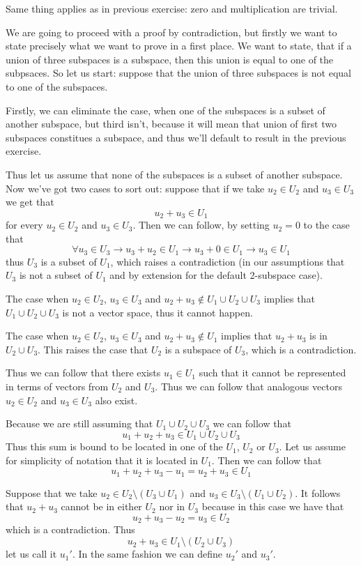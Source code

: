 \documentclass[11pt,oneside,titlepage]{book}
\begin{document}
Same thing applies as in previous exercise: zero and multiplication are
trivial.

We are going to proceed with a proof by contradiction, but firstly we want
to state precisely what we want to prove in a first place. We want to state,
that if a union of three subspaces is a subspace, then this union is equal to
one of the subpsaces. So let us start: suppose that the union of three subspaces is not equal to one of the subspaces.

Firstly, we can eliminate the case, when one of the subspaces is a
subset of another subspace, but third isn't, because it will mean that
union of first two subspaces constitues a subspace, and thus we'll default
to result in the previous exercise.

Thus let us assume that none of the subspaces is a subset of another subspace.
Now we've got two cases to sort out: suppose that if we take $u_2 \in U_2$
and $u_3 \in U_3$ we get that
$$u_2 + u_3 \in U_1$$
for every $u_2 \in U_2$ and $u_3 \in U_3$. Then we can follow, by setting
$u_2 = 0$ to the case that
$$\forall u_3 \in U_3 \to u_3 + u_2 \in U_1 \to u_3 + 0 \in U_1 \to
u_3 \in U_1$$
thus $U_3$ is a subset of $U_1$, which raises a contradiction (in our
assumptions that $U_3$ is not a subset of $U_1$  and by extension
for the default 2-subspace case).

The case when $u_2 \in U_2$, $u_3 \in U_3$ and $u_2 + u_3 \notin
U_1 \cup U_2 \cup U_3$ implies that $U_1 \cup U_2 \cup U_3$ is
not a vector space, thus it cannot happen.

The case when $u_2 \in U_2$, $u_3 \in U_3$ and $u_2 + u_3 \notin U_1$
implies that $u_2 + u_3$ is  in $U_2 \cup U_3$. This raises the case that
$U_2$ is a subspace of $U_3$, which is a contradiction.

Thus we can follow that there exists $u_1 \in U_1$ such that it
cannot be represented in terms of vectors from $U_2$ and $U_3$.
Thus we can follow that analogous  vectors   $u_2 \in U_2$ and $u_3 \in U_3$
also exist.

Because we are still assuming that $U_1 \cup U_2 \cup U_3$ we can follow that
$$u_1 + u_2 + u_3 \in U_1 \cup U_2 \cup U_3$$
Thus this sum is bound to be located in one of the $U_1$, $U_2$ or $U_3$.
Let us assume for simplicity of notation that it is located in $U_1$. Then
we can follow that
$$u_1 + u_2 + u_3 - u_1 = u_2 + u_3 \in U_1$$

Suppose that we take $u_2 \in U_2 \setminus (U_3 \cup U_1)$ and
$u_3 \in U_3 \setminus (U_1 \cup U_2)$. It follows that
$u_2 + u_3$ cannot be in either $U_2$ nor in $U_3$ because in this
case we have that
$$u_2 + u_3 - u_2 = u_3 \in U_2$$
which is a contradiction. Thus
$$u_2 + u_3 \in U_1 \setminus (U_2 \cup U_3)$$
let us call it $u_1'$. In the same fashion we can define $u_2'$ and $u_3'$.
\end{document}
